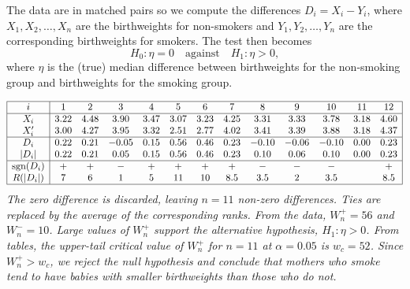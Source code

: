 \begin{solution}
The data are in matched pairs so we compute the differences $D_i=X_i-Y_i$, where $X_1,X_2,\ldots,X_n$ are the birthweights for non-smokers and $Y_1,Y_2,\ldots,Y_n$ are the corresponding birthweights for smokers. The test then becomes
\[
H_0:\eta = 0 \quad\text{against}\quad H_1:\eta > 0,
\]
where $\eta$ is the (true) median difference between birthweights for the non-smoking group and birthweights for the smoking group.

\small
\[\begin{array}{|c|cccccccccccc|} \hline
i			& 1      &  2     & 3      & 4      & 5      & 6      & 7      & 8      & 9      & 10     & 11     & 12   	\\ \hline
X_i			& 3.22   & 4.48   & 3.90   & 3.47   & 3.07   & 3.23   & 4.25   & 3.31   & 3.33   & 3.78   & 3.18   & 4.60 	\\ 
X'_i		& 3.00   & 4.27   & 3.95   & 3.32   & 2.51   & 2.77   & 4.02   & 3.41   & 3.39   & 3.88   & 3.18   & 4.37	\\ \hline
D_i			& 0.22   & 0.21   & -0.05  & 0.15   & 0.56   & 0.46   & 0.23   & -0.10  & -0.06  & -0.10  & 0.00  	& 0.23	\\
|D_i|		& 0.22   & 0.21   &  0.05  & 0.15   & 0.56   & 0.46   & 0.23   &  0.10  &  0.06  &  0.10  & 0.00  	& 0.23	\\ \hline
\text{sgn}(D_i)	& +      & +      & -      & +      & +      & +      & +      & -      & -      & -      &      	& +  	\\ 
R(|D_i|)		& 7      & 6      & 1      & 5      & 11     & 10     & 8.5    &  3.5   &  2     &  3.5   &      	& 8.5  	\\ \hline
\end{array}\]
\vspace*{-2ex}\normalsize
\bit
\it The zero difference is discarded, leaving $n=11$ non-zero differences.
\it Ties are replaced by the average of the corresponding ranks.
\eit
From the data, $W^{+}_n = 56$ and $W^{-}_n = 10$. \Big[Check: $W^{+}_n + W^{-}_n = 66 = \frac{1}{2}n(n+1)$.\Big]
\bit
\it Large values of $W^{+}_n$ support the alternative hypothesis, $H_1:\eta > 0$. 
\it From tables, the upper-tail critical value of $W^{+}_n$ for $n=11$ at $\alpha=0.05$ is $w_c = 52$. 
\eit
Since $W^{+}_n > w_c$, we reject the null hypothesis and conclude that mothers who smoke tend to have babies with smaller birthweights than those who do not. 
\end{solution}


